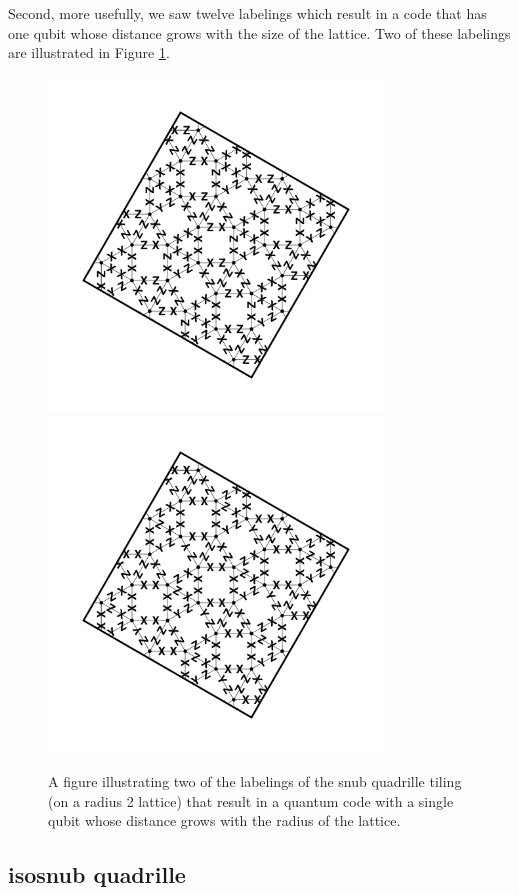 \documentclass[12pt]{amsbook}
\theoremstyle{plain}
\theoremstyle{definition}
\theoremstyle{remark}
\begin{document}
Second, more usefully, we saw twelve labelings which result in a code that has one qubit whose distance grows with the size of the lattice.  Two of these labelings are illustrated in Figure \ref{figure:snub-quadrille-code-r-labeling}.

\begin{figure}
\includegraphics[width=3.5in]{images/snub-quadrille-code-r-labeling-1} %
\includegraphics[width=3.5in]{images/snub-quadrille-code-r-labeling-2} %
\caption{
\label{figure:snub-quadrille-code-r-labeling}
A figure illustrating two of the labelings of the snub quadrille tiling (on a radius 2 lattice) that result in a quantum code with a single qubit whose distance grows with the radius of the lattice.
}
\end{figure}
\subsection{isosnub quadrille}
\end{document}
